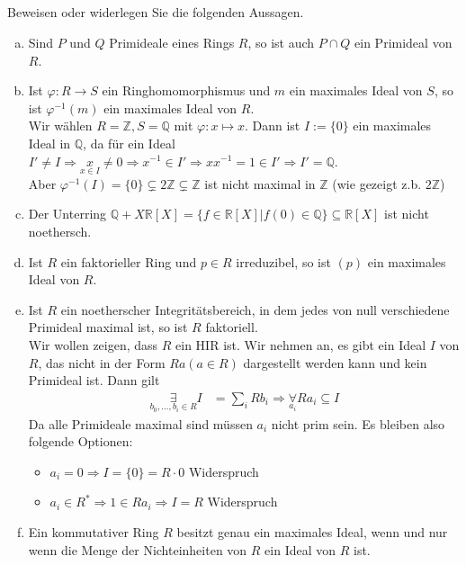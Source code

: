 \documentclass{article}
\newcommand{\Z}{\mathbb{Z}}
\newcommand{\R}{\mathbb{R}}
\newcommand{\Q}{\mathbb{Q}}
\begin{document}
\subsection{}
\color{blue}
Beweisen oder widerlegen Sie die folgenden Aussagen.
\color{black}
\begin{enumerate}[(a)]
    \item
        \color{blue}
        Sind $P$ und $Q$ Primideale eines Rings $R$, so ist auch $P\cap Q$ ein Primideal von $R$.
        \color{black}
    \item
        \color{blue}
        Ist $\varphi: R\to S$ ein Ringhomomorphismus und $m$ ein maximales Ideal von $S$, so ist $\varphi^{-1}(m)$
        ein maximales Ideal von $R$.\\
        \color{black}
        Wir wählen $R=\Z,S=\Q$ mit $\varphi:x\mapsto x$.
        Dann ist $I:=\{0\}$ ein maximales Ideal in $\Q$, da für
        ein Ideal $I'\neq I\Rightarrow\underset{x\in I}x\neq 0\Rightarrow x^{-1}\in I'
        \Rightarrow xx^{-1}=1\in I'\Rightarrow I'=\Q$.\\
        Aber $\varphi^{-1}(I)=\{0\}\subsetneq 2\Z\subsetneq\Z$ ist nicht maximal in $\Z$
        (wie gezeigt z.b. $2\Z$)
    \item
        \color{blue}
        Der Unterring $\Q+X\R[X]=\{f\in\R[X]|f(0)\in\Q\}\subseteq\R[X]$ ist nicht noethersch.
        \color{black}
    \item
        \color{blue}
        Ist $R$ ein faktorieller Ring und $p\in R$ irreduzibel, so ist $(p)$ ein maximales Ideal von $R$.
        \color{black}
    \item
        \color{blue}
        Ist $R$ ein noetherscher Integritätsbereich, in dem jedes von null verschiedene Primideal maximal ist,
        so ist $R$ faktoriell.\\
        \color{black}
        Wir wollen zeigen, dass $R$ ein HIR ist.
        Wir nehmen an, es gibt ein Ideal $I$ von $R$, das nicht in der Form $Ra(a\in R)$ dargestellt werden kann und
        kein Primideal ist. Dann gilt
        \begin{align*}
            \underset{b_0,\hdots,b_i\in R}\exists I&=\sum_i Rb_i
            \Rightarrow\underset{a_i}\forall Ra_i\subseteq I
        \end{align*}
        Da alle Primideale maximal sind müssen $a_i$ nicht prim sein.
        Es bleiben also folgende Optionen:
        \begin{itemize}
            \item
                $a_i=0\Rightarrow I=\{0\}=R\cdot 0$ Widerspruch
            \item
                $a_i\in R^*\Rightarrow 1\in Ra_i\Rightarrow I=R$ Widerspruch
        \end{itemize}
    \item
        \color{blue}
        Ein kommutativer Ring $R$ besitzt genau ein maximales Ideal,
        wenn und nur wenn die Menge der Nichteinheiten von $R$ ein Ideal von $R$ ist.
        \color{black}
\end{enumerate}
\end{document}
